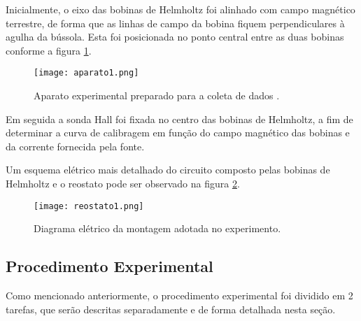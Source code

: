 \documentclass[reprint,amsmath,amssymb,aps]{revtex4-2}
\begin{document}
Inicialmente, o eixo das bobinas de Helmholtz foi alinhado com campo magnético terrestre, de forma que as linhas de campo da bobina fiquem perpendiculares à agulha da bússola. Esta foi posicionada no ponto central entre as duas bobinas conforme a figura \ref{aparato1}.
\begin{figure}[H]
\centering
\texttt{[image: aparato1.png]}
\caption{\label{aparato1} Aparato experimental preparado para a coleta de dados \cite{earthmagfield}.}
\end{figure}

Em seguida a sonda Hall foi fixada no centro das bobinas de Helmholtz, a fim de determinar a curva de calibragem em função do campo magnético das bobinas e da corrente fornecida pela fonte.

Um esquema elétrico mais detalhado do circuito composto pelas bobinas de Helmholtz e o reostato pode ser observado na figura \ref{reostato}.
\begin{figure}[H]
\centering
\texttt{[image: reostato1.png]}
\caption{\label{reostato} Diagrama elétrico da montagem adotada no experimento.}
\end{figure}

\subsection{Procedimento Experimental}

Como mencionado anteriormente, o procedimento experimental foi dividido em 2 tarefas, que serão descritas separadamente e de forma detalhada nesta seção.
\end{document}

